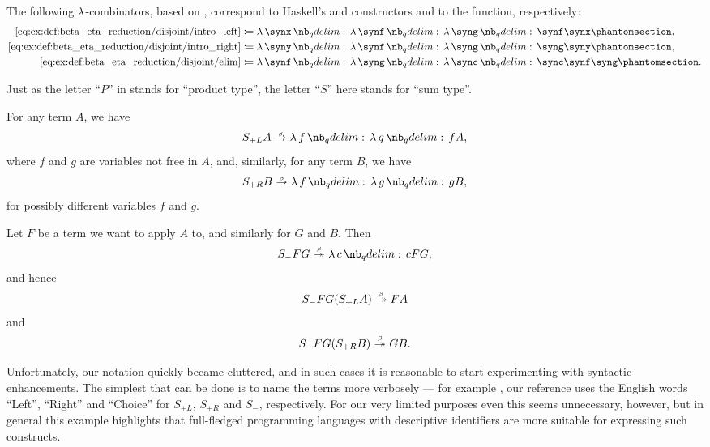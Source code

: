 \begin{example}
\begin{thmenum}
    The following \( \mathrm{\lambda} \)-combinators, based on \cite{MathOF:product_type_in_simply_typed_lambda_terms}, correspond to Haskell's  and  constructors and to the  function, respectively:
    \begin{align*}
      \ref{eq:ex:def:beta_eta_reduction/disjoint/intro_left}  &\coloneqq \qabs \synx \qabs \synf \qabs \syng \synf \synx       \taglabel[\ensuremath{ S_{+L} }]{eq:ex:def:beta_eta_reduction/disjoint/intro_left}, \\
      \ref{eq:ex:def:beta_eta_reduction/disjoint/intro_right} &\coloneqq \qabs \syny \qabs \synf \qabs \syng \syng \syny       \taglabel[\ensuremath{ S_{+R} }]{eq:ex:def:beta_eta_reduction/disjoint/intro_right}, \\
      \ref{eq:ex:def:beta_eta_reduction/disjoint/elim}        &\coloneqq \qabs \synf \qabs \syng \qabs \sync \sync \synf \syng \taglabel[\ensuremath{ S_- }]{eq:ex:def:beta_eta_reduction/disjoint/elim}.
    \end{align*}

    Just as the letter \enquote{\( P \)} in  stands for \enquote{product type}, the letter \enquote{\( S \)} here stands for \enquote{sum type}.

    For any term \( A \), we have
    \begin{equation*}
      S_{+L} A \bred \qabs f \qabs g f A,
    \end{equation*}
    where \( f \) and \( g \) are variables not free in \( A \), and, similarly, for any term \( B \), we have
    \begin{equation*}
      S_{+R} B \bred \qabs f \qabs g g B,
    \end{equation*}
    for possibly different variables \( f \) and \( g \).

    Let \( F \) be a term we want to apply \( A \) to, and similarly for \( G \) and \( B \). Then
    \begin{equation*}
      S_- F G \bred* \qabs c c F G,
    \end{equation*}
    and hence
    \begin{equation*}
      S_- F G (S_{+L} A) \bred* F A
    \end{equation*}
    and
    \begin{equation*}
      S_- F G (S_{+R} B) \bred* G B.
    \end{equation*}

    Unfortunately, our notation quickly became cluttered, and in such cases it is reasonable to start experimenting with syntactic enhancements. The simplest that can be done is to name the terms more verbosely --- for example , our reference \cite{MathOF:product_type_in_simply_typed_lambda_terms} uses the English words \enquote{Left}, \enquote{Right} and \enquote{Choice} for \( S_{+L} \), \( S_{+R} \) and \( S_- \), respectively. For our very limited purposes even this seems unnecessary, however, but in general this example highlights that full-fledged programming languages with descriptive identifiers are more suitable for expressing such constructs.


\end{thmenum}
\end{example}
